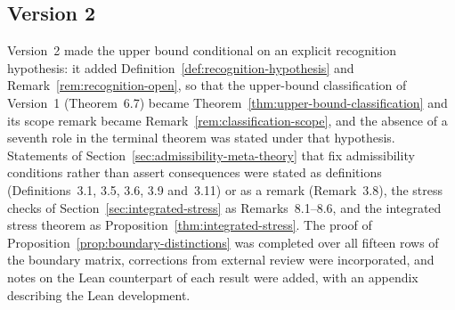 \subsection{Version 2}

Version~2 made the upper bound conditional on an explicit recognition
hypothesis: it added Definition~\ref{def:recognition-hypothesis} and
Remark~\ref{rem:recognition-open}, so that the upper-bound classification of
Version~1 (Theorem~6.7) became Theorem~\ref{thm:upper-bound-classification} and
its scope remark became Remark~\ref{rem:classification-scope}, and the absence
of a seventh role in the terminal theorem was stated under that hypothesis.
Statements of Section~\ref{sec:admissibility-meta-theory} that fix
admissibility conditions rather than assert consequences were stated as
definitions (Definitions~3.1, 3.5, 3.6, 3.9 and~3.11) or as a remark
(Remark~3.8), the stress checks of Section~\ref{sec:integrated-stress} as
Remarks~8.1--8.6, and the integrated stress theorem as
Proposition~\ref{thm:integrated-stress}. The proof of
Proposition~\ref{prop:boundary-distinctions} was completed over all fifteen
rows of the boundary matrix, corrections from external review were
incorporated, and notes on the Lean counterpart of each result were added,
with an appendix describing the Lean development.

